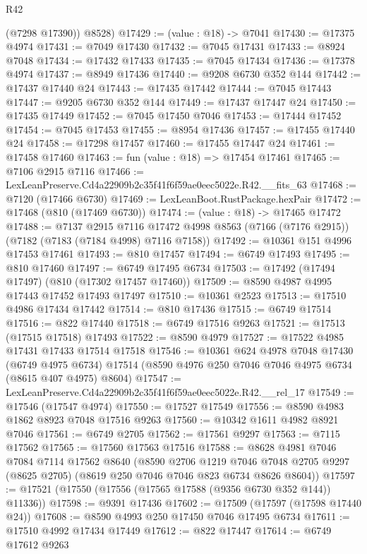 \begin{lexlean}{R42}
\begin{coremodule}
{        (@7298 @17390))
      @8528)
@17429 := (value : @18) -> @7041
@17430 := @17375 @4974
@17431 := @7049 @17430
@17432 := @7045 @17431
@17433 := @8924 @7048
@17434 := @17432 @17433
@17435 := @7045 @17434
@17436 := @17378 @4974
@17437 := @8949 @17436
@17440 := @9208 @6730 @352 @144
@17442 := @17437 @17440 @24
@17443 := @17435 @17442
@17444 := @7045 @17443
@17447 := @9205 @6730 @352 @144
@17449 := @17437 @17447 @24
@17450 := @17435 @17449
@17452 := @7045 @17450 @7046
@17453 := @17444 @17452
@17454 := @7045 @17453
@17455 := @8954 @17436
@17457 := @17455 @17440 @24
@17458 := @17298 @17457
@17460 := @17455 @17447 @24
@17461 := @17458 @17460
@17463 := fun (value : @18) => @17454 @17461
@17465 := @7106 @2915 @7116
@17466 := LexLeanPreserve.Cd4a22909b2c35f41f6f59ae0eec5022e.R42.__fits_63
@17468 := @7120 (@17466 @6730)
@17469 := LexLeanBoot.RustPackage.hexPair
@17472 := @17468 (@810 (@17469 @6730))
@17474 := (value : @18) -> @17465 @17472
@17488 := @7137
    @2915
    @7116
    @17472
    @4998
    @8563
    (@7166 (@7176 @2915))
    (@7182 (@7183 (@7184 @4998) @7116 @7158))
@17492 := @10361 @151 @4996 @17453 @17461
@17493 := @810 @17457
@17494 := @6749 @17493
@17495 := @810 @17460
@17497 := @6749 @17495 @6734
@17503 := @17492 (@17494 @17497) (@810 (@17302 @17457 @17460))
@17509 := @8590 @4987 @4995 @17443 @17452 @17493 @17497
@17510 := @10361 @2523
@17513 := @17510 @4986 @17434 @17442
@17514 := @810 @17436
@17515 := @6749 @17514
@17516 := @822 @17440
@17518 := @6749 @17516 @9263
@17521 := @17513 (@17515 @17518) @17493
@17522 := @8590 @4979
@17527 := @17522 @4985 @17431 @17433 @17514 @17518
@17546 := @10361
    @624
    @4978
    @7048
    @17430
    (@6749 @4975 @6734)
    @17514
    (@8590 @4976 @250 @7046 @7046 @4975 @6734 (@8615 @407 @4975) @8604)
@17547 := LexLeanPreserve.Cd4a22909b2c35f41f6f59ae0eec5022e.R42.__rel_17
@17549 := @17546 (@17547 @4974)
@17550 := @17527 @17549
@17556 := @8590 @4983 @1862 @8923 @7048 @17516 @9263
@17560 := @10342 @1611 @4982 @8921 @7046
@17561 := @6749 @2705
@17562 := @17561 @9297
@17563 := @7115 @17562
@17565 := @17560 @17563 @17516
@17588 := @8628
    @4981
    @7046
    @7084
    @7114
    @17562
    @8640
    (@8590
      @2706
      @1219
      @7046
      @7048
      @2705
      @9297
      (@8625 @2705)
      (@8619 @250 @7046 @7046 @823 @6734 @8626 @8604))
@17597 := @17521 (@17550 (@17556 (@17565 @17588 (@9356 @6730 @352 @144)) @11336))
@17598 := @9391 @17436
@17602 := @17509 (@17597 (@17598 @17440 @24))
@17608 := @8590 @4993 @250 @17450 @7046 @17495 @6734
@17611 := @17510 @4992 @17434 @17449
@17612 := @822 @17447
@17614 := @6749 @17612 @9263
}
\end{coremodule}
\end{lexlean}
